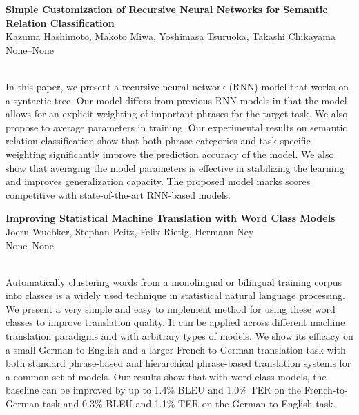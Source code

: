 \documentclass[twoside,makeidx]{book}
\begin{document}
\par\vspace{2em}\noindent%
\begin{minipage}{\linewidth}%
\begin{center}
\textbf{\normalsize Simple Customization of Recursive Neural Networks for Semantic Relation Classification}\\
\normalsize  Kazuma Hashimoto,  Makoto Miwa,  Yoshimasa Tsuruoka,  Takashi Chikayama\\
{\small None--None}\\
\end{center}
\end{minipage}\\[0.5em]
\nopagebreak%
\noindent%
{\small In this paper, we present a recursive neural network (RNN) model that works on a syntactic tree. Our model differs from previous RNN models in that the model allows for an explicit weighting of important phrases for the target task. We also propose to average parameters in training. Our experimental results on semantic relation classification show that both phrase categories and task-specific weighting significantly improve the prediction accuracy of the model. We also show that averaging the model parameters is effective in stabilizing the learning and improves generalization capacity. The proposed model marks scores competitive with state-of-the-art RNN-based models.}
\par\vspace{2em}\noindent%
\begin{minipage}{\linewidth}%
\begin{center}
\textbf{\normalsize Improving Statistical Machine Translation with Word Class Models}\\
\normalsize  Joern Wuebker,  Stephan Peitz,  Felix Rietig,  Hermann Ney\\
{\small None--None}\\
\end{center}
\end{minipage}\\[0.5em]
\nopagebreak%
\noindent%
{\small Automatically clustering words from a monolingual or bilingual training corpus into classes is a widely used technique in statistical natural language processing. We present a very simple and easy to implement method for using these word classes to improve translation quality. It can be applied across different machine translation paradigms and with arbitrary types of models. We show its efficacy on a small German-to-English and a larger French-to-German translation task with both standard phrase-based and hierarchical phrase-based translation systems for a common set of models. Our results show that with word class models, the baseline can be improved by up to 1.4\% BLEU and 1.0\% TER on the French-to-German task and 0.3\% BLEU and 1.1\% TER on the German-to-English task.}
\end{document}
